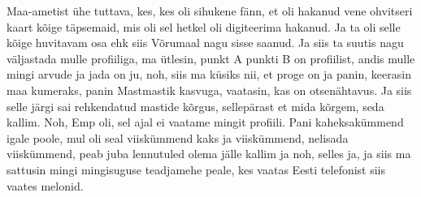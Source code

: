 Maa-ametist ühe tuttava, kes, kes oli sihukene fänn, et oli hakanud vene ohvitseri kaart kõige täpsemaid, mis oli sel hetkel oli digiteerima hakanud. Ja ta oli selle kõige huvitavam osa ehk siis Võrumaal nagu sisse saanud. Ja siis ta suutis nagu väljastada mulle profiiliga, ma ütlesin, punkt A punkti B on profiilist, andis mulle mingi arvude ja jada on ju, noh, siis ma küsiks nii, et proge on ja panin, keerasin maa kumeraks, panin Mastmastik kasvuga, vaatasin, kas on otsenähtavus. Ja siis selle järgi sai rehkendatud mastide kõrgus, sellepärast et mida kõrgem, seda kallim. Noh, Emp oli, sel ajal ei vaatame mingit profiili. Pani kaheksakümmend igale poole, mul oli seal viiskümmend kaks ja viiskümmend, nelisada viiskümmend, peab juba lennutuled olema jälle kallim ja noh, selles ja, ja siis ma sattusin mingi mingisuguse teadjamehe peale, kes vaatas Eesti telefonist siis vaates melonid.
